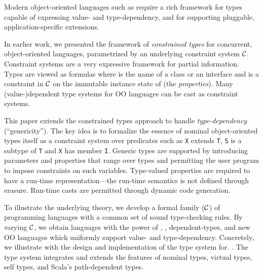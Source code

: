 
Modern object-oriented languages such as \Xten{} require a rich
framework for types capable of expressing value- and
type-dependency, and for supporting pluggable, application-specific
extensions.

In earlier work, we presented the framework of {\em constrained types}
for concurrent, object-oriented languages, parametrized by an
underlying constraint system $\cal C$. Constraint systems are a very
expressive framework for partial information. Types are viewed as
formulas  where  is the name of a class or an interface
and
 is a constraint in $\cal C$ on the immutable instance state of
 (the {\em properties}). Many (value-)dependent type systems
for OO languages can be cast as constraint systems.

This paper extends the constrained types approach to handle
{\em type-dependency} (``genericity''). The key idea is to formalize the
essence of nominal object-oriented types itself as a constraint system
over predicates such as {\tt X} extends {\tt T}, {\tt S} is a subtype
of {\tt T} and {\tt X} has member {\tt I}. Generic types are supported
by introducing parameters and properties that range over types and
permitting the user program to impose constraints on such
variables. Type-valued properties are required to have a run-time
representation---the run-time semantics is not defined through
erasure. Run-time casts are permitted through dynamic code generation.

To illustrate the underlying theory, we develop a formal family
\FX(${\cal C}$) of programming languages with a common set of sound
type-checking rules.  By varying $\cal C$, we obtain languages with
the power of \FJ, \FGJ, dependent-types, and new OO languages which
uniformly support value- and type-dependency.  Concretely, we
illustrate with the design and implementation of the type system for.
\Xten{}.  The type system integrates and extends the features of
nominal types, virtual types, self types, and Scala's path-dependent
types.

